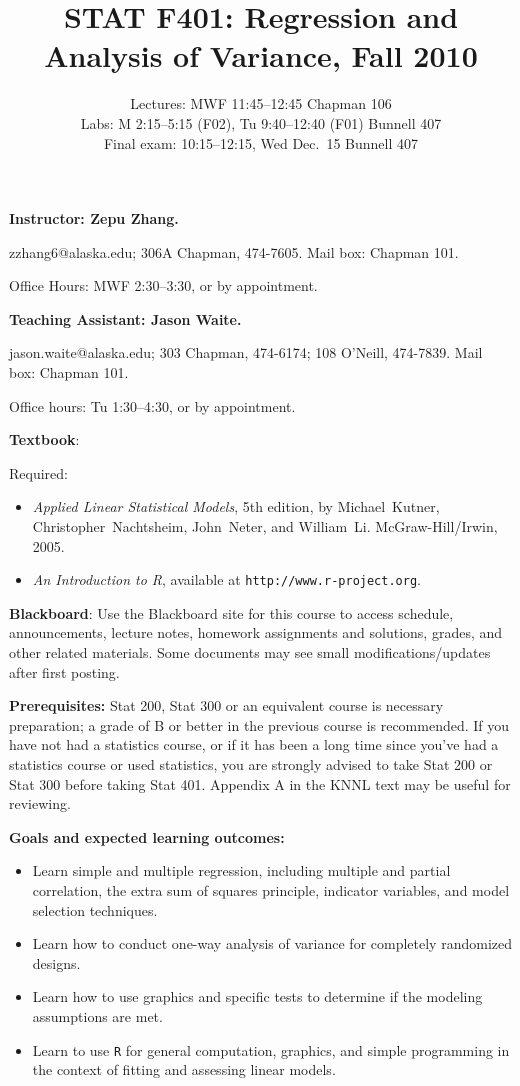 \documentclass{article}
\begin{document}
\title{STAT F401: Regression and Analysis of Variance, Fall 2010}
\author{%
Lectures: MWF 11:45--12:45 Chapman 106\\
Labs: M 2:15--5:15 (F02), Tu 9:40--12:40 (F01) Bunnell 407\\
Final exam: 10:15--12:15, Wed Dec.~15 Bunnell 407}
\date{}
\maketitle

\textbf{\large Instructor: Zepu Zhang.}

zzhang6@alaska.edu;
306A Chapman, 474-7605.
Mail box: Chapman 101.

Office Hours: MWF 2:30--3:30,
or by appointment.

\bigskip
\textbf{\large Teaching Assistant: Jason Waite.}

jason.waite@alaska.edu;
303 Chapman, 474-6174;
108 O'Neill, 474-7839.
Mail box: Chapman 101.

Office hours: Tu 1:30--4:30,
or by appointment.

\bigskip
\textbf{\large Textbook}:

Required:
\begin{itemize}
\item
\textit{Applied Linear Statistical Models}, 5th edition, by Michael~Kutner,
Christopher~Nachtsheim, John~Neter, and William~Li.  McGraw-Hill/Irwin,
2005.
\item
\textit{An Introduction to R}, available at
\texttt{http://www.r-project.org}.
\end{itemize}

\bigskip
\textbf{\large Blackboard}:
Use the Blackboard site for this course to access
schedule, announcements, lecture notes, homework assignments and
solutions, grades, and other related materials.
Some documents may see small modifications/updates after first posting.

\bigskip
\textbf{\large Prerequisites:}
Stat 200, Stat 300 or an equivalent course is necessary preparation; a grade of B
or better in the previous course is recommended.  If you have not had a statistics
course, or if it has been a long time since you've had a statistics course or used
statistics, you are strongly advised to take Stat 200 or Stat 300 before taking
Stat 401.  Appendix A in the KNNL text may be useful for reviewing.

\bigskip
\textbf{\large Goals and expected learning outcomes:}
\begin{itemize}
\item Learn simple and multiple regression, including multiple and
partial correlation, the extra sum of squares principle, indicator variables,
and model selection techniques.
\item Learn how to conduct one-way analysis of variance for
completely randomized designs.
\item Learn how to use graphics and specific tests to determine if the 
modeling assumptions are met.
\item Learn to use \texttt{R} for general computation, graphics, and
simple programming in the context of fitting and assessing linear
models.
\end{itemize}
\end{document}
